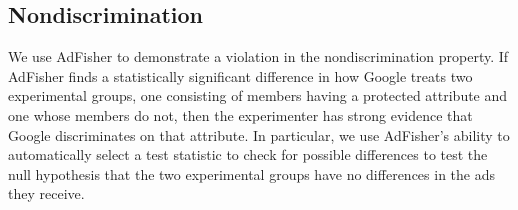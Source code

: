 \documentclass{article}
\begin{document}
\newcommand{\topspacesub}{\vspace{0ex}}
\newcommand{\midspacesub}{\vspace{-2ex}}
\newcommand{\botspacesub}{}


\subsection{Nondiscrimination}
\label{sec:gender}

We use AdFisher to demonstrate a violation in the nondiscrimination property. If AdFisher finds a statistically significant difference in how Google treats two experimental groups, one consisting of members having a protected attribute and one whose members do not, then the experimenter has strong evidence that Google discriminates on that attribute.
In particular, we use AdFisher's ability to automatically select a test statistic to check for possible differences to test the null hypothesis that the two experimental groups have no differences in the ads they receive.
\end{document}
